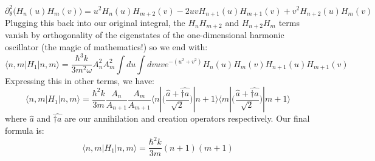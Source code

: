 \documentclass[12pt]{article}
\begin{document}
$$\partial_\theta^2 \bigg( H_n(u) H_m(v) \bigg) = u^2 H_n(u) H_{m+2}(v) -2uvH_{n+1}(u)H_{m+1}(v) + v^2 H_{n+2}(u) H_m(v)$$
Plugging this back into our original integral, the $H_n H_{m+2}$ and $H_{n+2}H_m$ terms vanish by orthogonality of the eigenstates of the one-dimensional harmonic oscillator (the magic of mathematics!) so we end with:
$$\langle n,m | H_1 | n,m \rangle =  \frac{\hbar^3 k }{3m^2 \omega} A_n^2 A_m^2 \int du \int dv uv e^{-(u^2 + v^2)} H_n(u) H_m(v) H_{n+1}(u) H_{m+1}(v)$$
Expressing this in other terms, we have:
$$\langle n,m | H_1 | n,m \rangle =  \frac{\hbar^2 k}{3 m} \frac{A_n}{A_{n+1}} \frac{A_m}{A_{m+1}} \langle n | \bigg( \frac{\hat{a} + \hat{\dagger{a}}}{\sqrt{2}} \bigg) | n+1 \rangle \langle m | \bigg( \frac{\hat{a} + \hat{\dagger{a}}}{\sqrt{2}} \bigg) | m+1 \rangle$$
where $\hat{a}$ and $\hat{\dagger{a}}$ are our annihilation and creation operators respectively. Our final formula is:
$$\langle n,m | H_1 | n,m \rangle =  \frac{\hbar^2 k}{3 m} (n+1)(m+1)$$
\end{document}
